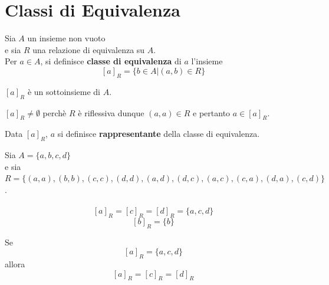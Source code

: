 \documentclass[a4paper,12pt, oneside]{book}
\begin{document}
\section{Classi di Equivalenza}
\begin{definizione}
	Sia $A$ un insieme non vuoto\\ e sia $R$ una relazione di equivalenza su $A$.\\
	Per $a \in A$, si definisce \textbf{classe di equivalenza} di $a$ l'insieme $$[a]_{R} = \{b \in A | (a,b) \in R\}$$
\end{definizione}
\begin{nota}
	$[a]_{R}$ è un sottoinsieme di $A$.
\end{nota}
\begin{nota}
	$[a]_{R} \not = \emptyset$ perchè $R$ è riflessiva dunque $(a,a) \in R$ e pertanto $a \in [a]_{R}$.
\end{nota}
\begin{nota}
	Data $[a]_{R}$, $a$ si definisce \textbf{rappresentante} della classe di equivalenza.
\end{nota}
\begin{shaded}
	\begin{esempio}
		Sia $A = \{a,b,c,d\}$\\e sia $R=\{(a,a),(b,b),(c,c),(d,d),(a,d),(d,c),(a,c),(c,a),(d,a),(c,d)\}$.\\\\
		$$[a]_{R} = [c]_{R} = [d]_{R}= \{a,c,d\}$$
		$$[b]_{R} = \{b\}$$
	\end{esempio}
	\begin{nota}
		Se $$[a]_{R} = \{a,c,d\}$$ allora $$[a]_{R} = [c]_{R} = [d]_{R}$$
	\end{nota}
\end{shaded}
\end{document}
